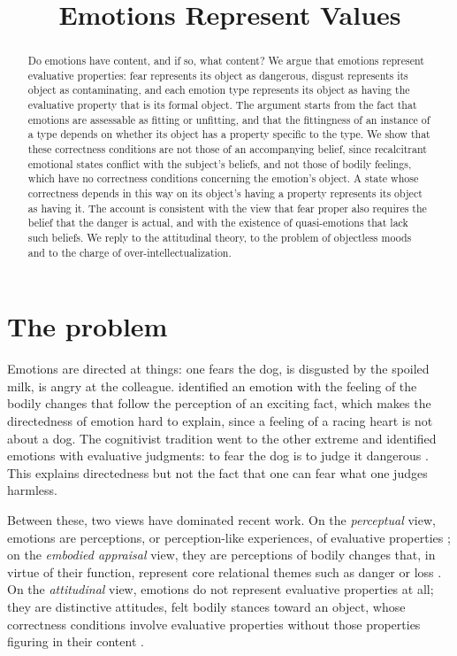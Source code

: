 \documentclass{situationist-preprint}
\title{Emotions Represent Values}
\begin{document}
\maketitle

\begin{abstract}
Do emotions have content, and if so, what content? We argue that emotions represent evaluative properties: fear represents its object as dangerous, disgust represents its object as contaminating, and each emotion type represents its object as having the evaluative property that is its formal object. The argument starts from the fact that emotions are assessable as fitting or unfitting, and that the fittingness of an instance of a type depends on whether its object has a property specific to the type. We show that these correctness conditions are not those of an accompanying belief, since recalcitrant emotional states conflict with the subject's beliefs, and not those of bodily feelings, which have no correctness conditions concerning the emotion's object. A state whose correctness depends in this way on its object's having a property represents its object as having it. The account is consistent with the view that fear proper also requires the belief that the danger is actual, and with the existence of quasi-emotions that lack such beliefs. We reply to the attitudinal theory, to the problem of objectless moods and to the charge of over-intellectualization.
\end{abstract}

\section{The problem}

Emotions are directed at things: one fears the dog, is disgusted by the spoiled milk, is angry at the colleague. \citet{James1884} identified an emotion with the feeling of the bodily changes that follow the perception of an exciting fact, which makes the directedness of emotion hard to explain, since a feeling of a racing heart is not about a dog. The cognitivist tradition went to the other extreme and identified emotions with evaluative judgments: to fear the dog is to judge it dangerous \citep{Solomon1976,Nussbaum2001}. This explains directedness but not the fact that one can fear what one judges harmless.

Between these, two views have dominated recent work. On the \emph{perceptual} view, emotions are perceptions, or perception-like experiences, of evaluative properties \citep{deSousa1987,Tappolet2016}; on the \emph{embodied appraisal} view, they are perceptions of bodily changes that, in virtue of their function, represent core relational themes such as danger or loss \citep{Prinz2004,Lazarus1991}. On the \emph{attitudinal} view, emotions do not represent evaluative properties at all; they are distinctive attitudes, felt bodily stances toward an object, whose correctness conditions involve evaluative properties without those properties figuring in their content \citep{DeonnaTeroni2012,DeonnaTeroni2015}.
\end{document}
